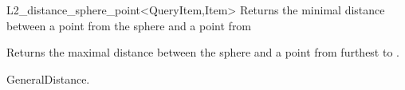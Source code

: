 \begin{ccRefClass}{L2_distance_sphere_point<QueryItem,Item>}
{Returns the minimal distance between a point from the sphere  and a point from
}

{Returns the maximal distance between the sphere  and
a point from  furthest to .}


\ccSeeAlso

GeneralDistance.



\end{ccRefClass}



